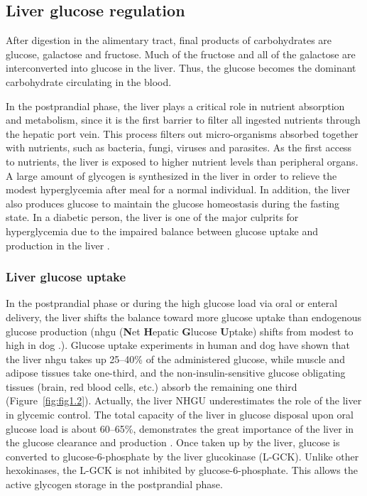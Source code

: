 \subsection{Liver glucose regulation}

After digestion in the alimentary tract, final products of carbohydrates are glucose, galactose and fructose. Much of the fructose and all of the galactose are interconverted into glucose in the liver. Thus, the glucose becomes the dominant carbohydrate circulating in the blood. 

In the postprandial phase, the liver plays a critical role in nutrient absorption and metabolism, since it is the first barrier to filter all ingested nutrients through the hepatic port vein. This process filters out micro-organisms absorbed together with nutrients, such as bacteria, fungi, viruses and parasites. As the first access to nutrients, the liver is exposed to higher nutrient levels than peripheral organs. A large amount of glycogen is synthesized in the liver in order to relieve the modest hyperglycemia after meal for a normal individual. In addition, the liver also produces glucose to maintain the glucose homeostasis during the fasting state. In a diabetic person, the liver is one of the major culprits for hyperglycemia due to the impaired balance between glucose uptake and production in the liver \cite{krssak_alterations_2004}. 

\subsubsection{Liver glucose uptake}

In the postprandial phase or during the high glucose load via oral or enteral delivery, the liver shifts the balance toward more glucose uptake than endogenous glucose production (\gls{nhgu} (\textbf{N}et \textbf{H}epatic \textbf{G}lucose \textbf{U}ptake) shifts from modest to high in dog \cite{abumrad_absorption_1982,moore_sources_1991}.). Glucose uptake experiments in human and dog have shown that the liver \gls{nhgu} takes up 25--40\% of the administered glucose, while muscle and adipose tissues take one-third, and the non-insulin-sensitive glucose obligating tissues (brain, red blood cells, etc.) absorb the remaining one third (Figure~\ref{fig:fig1.2}). Actually, the liver NHGU underestimates the role of the liver in glycemic control. The total capacity of the liver in glucose disposal upon oral glucose load is about 60--65\%, demonstrates the great importance of the liver in the glucose clearance and production \cite{moore_regulation_2012}. Once taken up by the liver, glucose is converted to glucose-6-phosphate by the liver glucokinase (L-GCK). Unlike other hexokinases, the L-GCK is not inhibited by glucose-6-phosphate. This allows the active glycogen storage in the postprandial phase.

